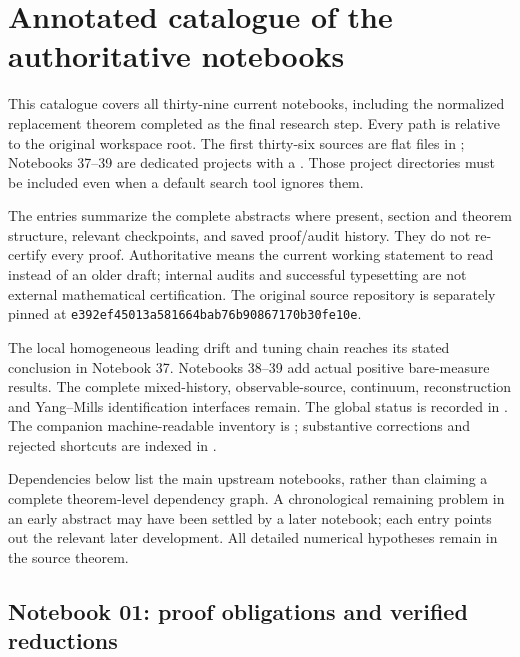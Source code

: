 \section{Annotated catalogue of the authoritative notebooks}
\label{hnc-catalogue}
This catalogue covers all thirty-nine current notebooks, including
the normalized replacement theorem completed as the final research step.
Every path is relative to the original workspace root. The first
thirty-six sources are flat files in ; Notebooks 37--39
are dedicated projects with a . Those project directories
must be included even when a default search tool ignores them.

The entries summarize the complete abstracts where present, section
and theorem structure, relevant checkpoints, and saved proof/audit
history. They do not re-certify every proof. Authoritative means the
current working statement to read instead of an older draft; internal
audits and successful typesetting are not external mathematical
certification. The original source repository is separately pinned at
\texttt{e392ef45013a581664bab76b90867170b30fe10e}.

The local homogeneous leading drift and tuning chain reaches its
stated conclusion in Notebook 37. Notebooks 38--39 add actual positive
bare-measure results. The complete mixed-history, observable-source,
continuum, reconstruction and Yang--Mills identification interfaces
remain. The global status is recorded in
.
The companion machine-readable inventory is
; substantive corrections
and rejected shortcuts are indexed in
.

Dependencies below list the main upstream notebooks, rather than
claiming a complete theorem-level dependency graph. A chronological
remaining problem in an early abstract may have been settled by a
later notebook; each entry points out the relevant later development.
All detailed numerical hypotheses remain in the source theorem.


\subsection{Notebook 01: proof obligations and verified reductions}
\label{hnc-01}
\noindent{}\par

